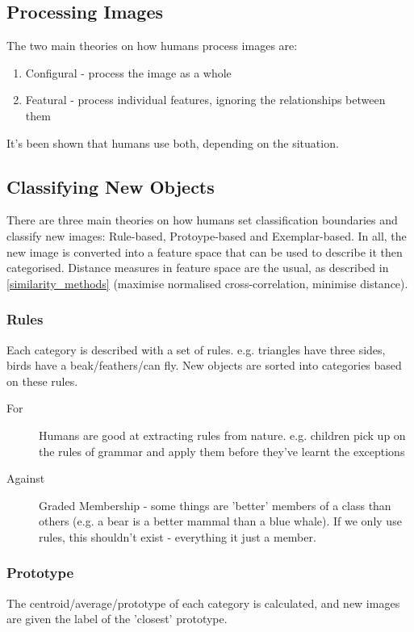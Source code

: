 \subsection{Processing Images}
The two main theories on how humans process images are:
\begin{enumerate}
    \item Configural - process the image as a whole
    \item Featural - process individual features, ignoring the relationships between them
\end{enumerate}
It's been shown that humans use both, depending on the situation.

\subsection{Classifying New Objects}
There are three main theories on how humans set classification boundaries and classify new images: Rule-based, Protoype-based and Exemplar-based. In all, the new image is converted into a feature space that can be used to describe it then categorised. Distance measures in feature space are the usual, as described in \ref{similarity_methods} (maximise normalised cross-correlation, minimise distance).

\subsubsection{Rules}
Each category is described with a set of rules. e.g. triangles have three sides, birds have a beak/feathers/can fly. New objects are sorted into categories based on these rules.

\begin{description}
    \item[For] Humans are good at extracting rules from nature. e.g. children pick up on the rules of grammar and apply them before they've learnt the exceptions
    \item[Against] Graded Membership - some things are 'better' members of a class than others (e.g. a bear is a better mammal than a blue whale). If we only use rules, this shouldn't exist - everything it just a member.
\end{description}

\subsubsection{Prototype}
The centroid/average/prototype of each category is calculated, and new images are given the label of the 'closest' prototype.

